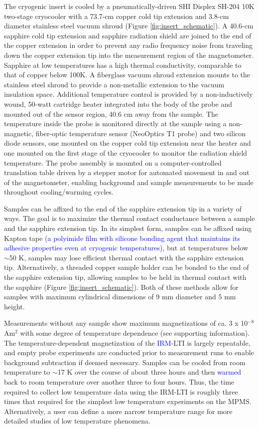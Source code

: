 \documentclass[draft,gc]{AGUTeX}
\begin{document}
\begin{article}
The cryogenic insert is cooled by a pneumatically-driven SHI Displex SH-204 10K two-stage cryocooler with a 73.7-cm copper cold tip extension and 3.8-cm diameter stainless steel vacuum shroud (Figure \ref{fig:insert_schematic}). A 40.6-cm sapphire cold tip extension and sapphire radiation shield are joined to the end of the copper extension in order to prevent any radio frequency noise from traveling down the copper extension tip into the measurement region of the magnetometer. Sapphire at low temperatures has a high thermal conductivity, comparable to that of copper below 100K. A fiberglass vacuum shroud extension mounts to the stainless steel shroud to provide a non-metallic extension to the vacuum insulation space. Additional temperature control is provided by a non-inductively wound, 50-watt cartridge heater integrated into the body of the probe and mounted out of the sensor region, 40.6 cm away from the sample. The temperature inside the probe is monitored directly at the sample using a non-magnetic, fiber-optic temperature sensor (NeoOptics T1 probe) and two silicon diode sensors, one mounted on the copper cold tip extension near the heater and one mounted on the first stage of the cryocooler to monitor the radiation shield temperature. The probe assembly is mounted on a computer-controlled translation table driven by a stepper motor for automated movement in and out of the magnetometer, enabling background and sample measurements to be made throughout cooling/warming cycles.

Samples can be affixed to the end of the sapphire extension tip in a variety of ways. The goal is to maximize the thermal contact conductance between a sample and the sapphire extension tip. In its simplest form, samples can be affixed using Kapton tape \textcolor{blue}{(a polyimide film with silicone bonding agent that maintains its adhesive properties even at cryogenic temperatures)}, but at temperatures below $\sim$50 K, samples may lose efficient thermal contact with the sapphire extension tip.  Alternatively, a threaded copper sample holder can be bonded to the end of the sapphire extension tip, allowing samples to be held in thermal contact with the sapphire (Figure \ref{fig:insert_schematic}). Both of these methods allow for samples with maximum cylindrical dimensions of 9 mm diameter and 5 mm height.

Measurements without any sample show maximum magnetizations of ca. 3 x 10$^{-8}$ Am$^2$ with some degree of temperature dependence (see supporting information). The temperature-dependent magnetization of the \textcolor{blue}{IRM-}LTI is largely repeatable, and empty probe experiments are conducted prior to measurement runs to enable background subtraction if deemed necessary. Samples can be cooled from room temperature to $\sim$17 K over the course of about three hours and then \textcolor{blue}{warmed}
back to room temperature over another three to four hours. Thus, the time required to collect low temperature data using the IRM-LTI is roughly three times that required for the simplest low temperature experiments on the MPMS.  Alternatively, a user can define a more narrow temperature range for more detailed studies of low temperature phenomena.  


\end{article}
\end{document}
